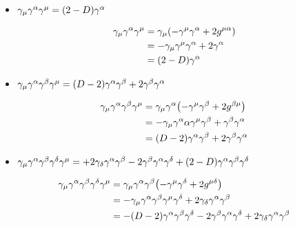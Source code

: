 \begin{itemize}
    \item $\gamma_\mu\gamma^\alpha\gamma^\mu=\qty(2-D)\gamma^\alpha$
\end{itemize}

\begin{align}
    \gamma_\mu\gamma^\alpha\gamma^\mu&=\gamma_\mu\qty(-\gamma^\mu\gamma^\alpha+2g^{\mu\alpha})\nonumber\\
    &=-\gamma_\mu\gamma^\mu\gamma^\alpha+2\gamma^\alpha\nonumber\\
    &=\qty(2-D)\gamma^\alpha
\end{align}

\begin{itemize}
    \item $\gamma_\mu\gamma^\alpha\gamma^\beta\gamma^\mu=\qty(D-2)\gamma^\alpha\gamma^\beta+2\gamma^\beta\gamma^\alpha$
\end{itemize}

\begin{align}
    \gamma_\mu\gamma^\alpha\gamma^\beta\gamma^\mu&=\gamma_\mu\gamma^\alpha\qty(-\gamma^\mu\gamma^\beta+2g^{\beta\mu})\nonumber\\
    &=-\gamma_\mu\gamma^\alpha\alpha\gamma^\mu\gamma^\beta+\gamma^\beta\gamma^\alpha\nonumber\\
    &=\qty(D-2)\gamma^\alpha\gamma^\beta+2\gamma^\beta\gamma^\alpha\nonumber
\end{align}

\begin{itemize}
    \item $\gamma_\mu\gamma^\alpha\gamma^\beta\gamma^\delta\gamma^\mu=+2\gamma_\delta\gamma^\alpha\gamma^\beta-2\gamma^\beta\gamma^\alpha\gamma^\delta+\qty(2-D)\gamma^\alpha\gamma^\beta\gamma^\delta$
\end{itemize}

\begin{align}
    \gamma_\mu\gamma^\alpha\gamma^\beta\gamma^\delta\gamma^\mu&=
    \gamma_\mu\gamma^\alpha\gamma^\beta\qty(-\gamma^\mu\gamma^\delta+2g^{\mu\delta})\nonumber\\
    &=-\gamma_\mu\gamma^\alpha\gamma^\beta\gamma^\mu\gamma^\delta+2\gamma_\delta\gamma^\alpha\gamma^\beta\nonumber\\
    &=-\qty(D-2)\gamma^\alpha\gamma^\beta\gamma^\delta-2\gamma^\beta\gamma^\alpha\gamma^\delta+2\gamma_\delta\gamma^\alpha\gamma^\beta\nonumber
\end{align}